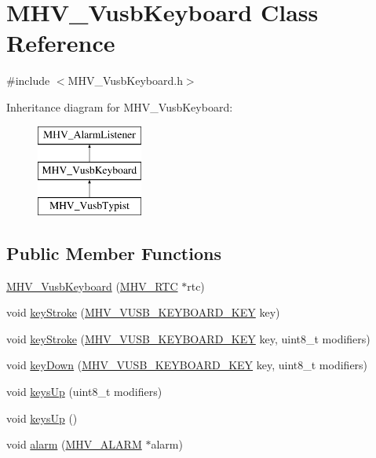 \hypertarget{class_m_h_v___vusb_keyboard}{
\section{\-M\-H\-V\-\_\-\-Vusb\-Keyboard \-Class \-Reference}
\label{class_m_h_v___vusb_keyboard}
}


{\ttfamily \#include $<$\-M\-H\-V\-\_\-\-Vusb\-Keyboard.\-h$>$}

\-Inheritance diagram for \-M\-H\-V\-\_\-\-Vusb\-Keyboard\-:\begin{figure}[H]
\begin{center}
\leavevmode
\includegraphics[height=3.000000cm]{class_m_h_v___vusb_keyboard}
\end{center}
\end{figure}
\subsection*{\-Public \-Member \-Functions}
\begin{DoxyCompactItemize}
\item 
\hyperlink{class_m_h_v___vusb_keyboard_a254424c0e1f8bcd795f18ae06765b805}{\-M\-H\-V\-\_\-\-Vusb\-Keyboard} (\hyperlink{class_m_h_v___r_t_c}{\-M\-H\-V\-\_\-\-R\-T\-C} $\ast$rtc)
\item 
void \hyperlink{class_m_h_v___vusb_keyboard_a01b3de864f8320c23118ac2ff34ca7a7}{key\-Stroke} (\hyperlink{_m_h_v___vusb_keyboard_8h_a03702cf5dad1661f75eda7bd2e33acb6}{\-M\-H\-V\-\_\-\-V\-U\-S\-B\-\_\-\-K\-E\-Y\-B\-O\-A\-R\-D\-\_\-\-K\-E\-Y} key)
\item 
void \hyperlink{class_m_h_v___vusb_keyboard_a6d2161121f4eaef0e41e2b6af956155f}{key\-Stroke} (\hyperlink{_m_h_v___vusb_keyboard_8h_a03702cf5dad1661f75eda7bd2e33acb6}{\-M\-H\-V\-\_\-\-V\-U\-S\-B\-\_\-\-K\-E\-Y\-B\-O\-A\-R\-D\-\_\-\-K\-E\-Y} key, uint8\-\_\-t modifiers)
\item 
void \hyperlink{class_m_h_v___vusb_keyboard_a879506b2ef1622e09070a9ccf11fdd10}{key\-Down} (\hyperlink{_m_h_v___vusb_keyboard_8h_a03702cf5dad1661f75eda7bd2e33acb6}{\-M\-H\-V\-\_\-\-V\-U\-S\-B\-\_\-\-K\-E\-Y\-B\-O\-A\-R\-D\-\_\-\-K\-E\-Y} key, uint8\-\_\-t modifiers)
\item 
void \hyperlink{class_m_h_v___vusb_keyboard_a0dd607bb70fe5f5354f407e8c4f12df1}{keys\-Up} (uint8\-\_\-t modifiers)
\item 
void \hyperlink{class_m_h_v___vusb_keyboard_a02ac5757295595e455ef3103d2ccc1de}{keys\-Up} ()
\item 
void \hyperlink{class_m_h_v___vusb_keyboard_a3f320339da1b79feb100374bbf688900}{alarm} (\hyperlink{_m_h_v___r_t_c_8h_af13307658f41fba330ffae04dd5cbce6}{\-M\-H\-V\-\_\-\-A\-L\-A\-R\-M} $\ast$alarm)
\end{DoxyCompactItemize}
